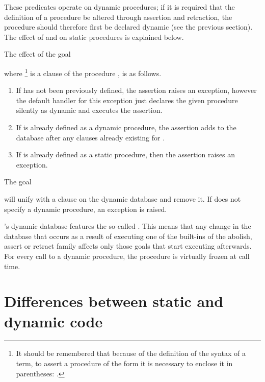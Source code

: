 These predicates operate on dynamic procedures; if it is
required that the definition of a procedure be altered through
assertion and retraction, the procedure should therefore first be declared
dynamic (see the previous section). The effect of
 and
 on static procedures
is explained below.


The effect of the goal
\begin{quote}
\end{quote}
where
\footnote{%
  It should be remembered that because of the
  definition of the syntax of a term, to assert a procedure of the form
   it is necessary to enclose it in parentheses:
  .}
is a clause of the procedure , is as follows.
\begin{enumerate}
\item If  has not been previously defined, the assertion
raises an exception, however the default handler for this exception
just declares the given procedure silently as dynamic and executes
the assertion.

\item If  is already defined as a dynamic procedure,
the assertion adds 
to the database after any clauses already existing for .

\item If  is already defined as a static procedure, then the
  assertion raises an exception.
\end{enumerate}

\noindent
The goal
\begin{quote}
\end{quote}
will unify  with a clause on the dynamic database and remove it.
If  does not specify a dynamic procedure, an exception is raised.

{\eclipse}'s dynamic database features the so-called
.
This means that any change in the database that occurs as a result of
executing one of the built-ins of the abolish, assert or retract family
affects only those goals that start executing
afterwards. For every call to a dynamic procedure, the procedure is
virtually frozen at call time.

\section{Differences between static and dynamic code}

